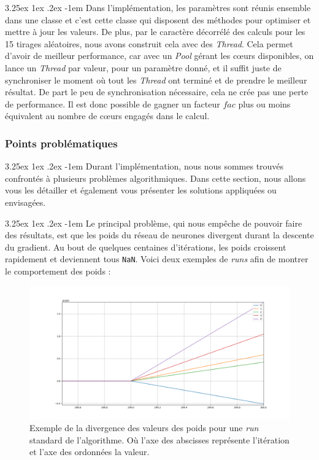 \documentclass[a4paper, 11pt]{article}
\makeatletter
\renewcommand\paragraph{\@startsection{paragraph}{5}{\z@}%
  {3.25ex \@plus1ex \@minus.2ex}%
  {-1em}%
  {\normalfont\normalsize\bfseries}}
\makeatother
\begin{document}
\paragraph{}
Dans l'implémentation, les paramètres sont réunis ensemble dans une classe et c'est cette classe qui disposent des méthodes pour optimiser et mettre à 
jour les valeurs. De plus, par le caractère décorrélé des calculs pour les 15 tirages aléatoires, nous avons construit cela avec des \textit{Thread}. Cela
permet d'avoir de meilleur performance, car avec un \textit{Pool} gérant les cœurs disponibles, on lance un \textit{Thread} par valeur, pour un 
paramètre donné, et il suffit juste de synchroniser le moment
où tout les \textit{Thread} ont terminé et de prendre le meilleur résultat. De part le peu de synchronisation nécessaire, cela ne crée pas une perte de
performance. Il est donc possible de gagner un facteur $fac$ plus ou moins équivalent au nombre de cœurs engagés dans le calcul.

\subsubsection{Points problématiques}
\paragraph{}
Durant l'implémentation, nous nous sommes trouvés confrontés à plusieurs problèmes algorithmiques. Dans cette section, nous allons vous les détailler et
également vous présenter les solutions appliquées ou envisagées.

\paragraph{}
Le principal problème, qui nous empêche de pouvoir faire des résultats, est que les poids du réseau de neurones divergent durant la descente du gradient.
Au bout de quelques centaines d'itérations, les poids croissent rapidement et deviennent tous \texttt{NaN}. Voici deux exemples de \textit{runs} afin de
montrer le comportement des poids :
\begin{figure}[H]
\centering
\includegraphics[scale=0.40]{images/run_1}
\caption{Exemple de la divergence des valeurs des poids pour une \textit{run} standard de l'algorithme. Où l'axe des abscisses représente l'itération et
l'axe des ordonnées la valeur.}
\end{figure}
\end{document}
